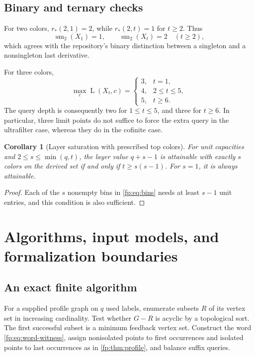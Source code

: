 \documentclass[11pt,letterpaper]{article}
\numberwithin{equation}{section}
\newtheorem{corollary}[corollary]{Corollary}
\theoremstyle{definition}
\theoremstyle{remark}
\theoremstyle{definition}
\newcommand{\sm}{\operatorname{sm}}
\newcommand{\layers}{\operatorname{L}}
\begin{document}
\subsection{Binary and ternary checks}

For two colors, \(r_*(2,1)=2\), while \(r_*(2,t)=1\) for \(t\geq2\).
Thus
\[
 \sm_2(X_1)=1,\qquad \sm_2(X_t)=2\quad(t\geq2),
\]
which agrees with the repository's binary distinction between a singleton
and a nonsingleton last derivative.

For three colors,
\[
 \max_c\layers(X_t,c)=
 \begin{cases}
 3,&t=1,\\
 4,&2\leq t\leq5,\\
 5,&t\geq6.
 \end{cases}
\]
The query depth is consequently two for \(1\leq t\leq5\), and three
for \(t\geq6\). In particular, three limit points do not suffice to
force the extra query in the ultrafilter case, whereas they do in the
cofinite case.

\begin{corollary}[Layer saturation with prescribed top colors]
For unit capacities and \(2\leq s\leq\min(q,t)\), the layer value
\(q+s-1\) is attainable with exactly \(s\) colors on the derived set
if and only if \(t\geq s(s-1)\). For \(s=1\), it is always attainable.
\end{corollary}
\begin{proof}
Each of the \(s\) nonempty bins in \cref{fp:eq:bins} needs at least
\(s-1\) unit entries, and this condition is also sufficient.
\end{proof}

\section{Algorithms, input models, and formalization boundaries}
\label{fp:sec:algorithms}

\subsection{An exact finite algorithm}

For a supplied profile graph on \(q\) used labels, enumerate subsets
\(R\) of its vertex set in increasing cardinality. Test whether
\(G-R\) is acyclic by a topological sort. The first successful subset
is a minimum feedback vertex set. Construct the word
\cref{fp:eq:word-witness}, assign nonisolated points to first occurrences and
isolated points to last occurrences as in \cref{fp:thm:profile}, and balance
suffix queries.
\end{document}

